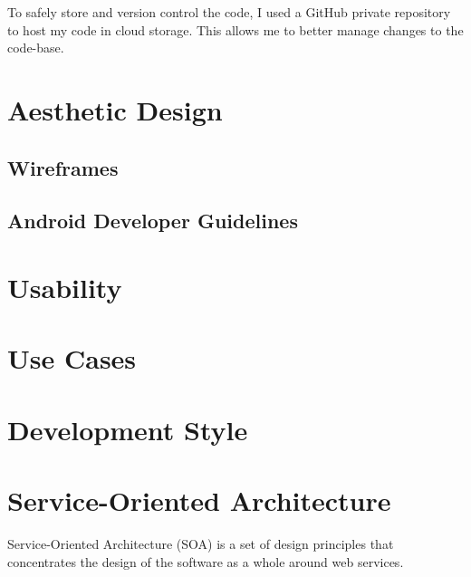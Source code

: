 To safely store and version control the code, I used a GitHub private repository to host my code in cloud storage. 
This allows me to better manage changes to the code-base. 

\section{Aesthetic Design}

\subsection{Wireframes}

\subsection{Android Developer Guidelines}

\section{Usability}

\section{Use Cases}	

\section{Development Style}

\section{Service-Oriented Architecture}
Service-Oriented Architecture (SOA) is a set of design principles that concentrates the design of the software as a whole around web services.
